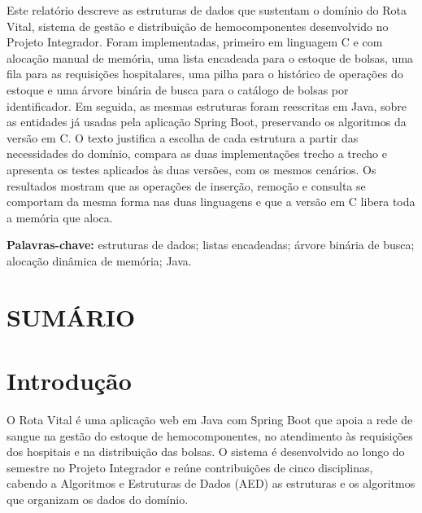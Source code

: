 \documentclass[12pt,a4paper,oneside]{report}
\renewcommand{\headrulewidth}{0pt}
\begin{document}
\begin{singlespace}
Este relatório descreve as estruturas de dados que sustentam o domínio do Rota Vital, sistema de gestão e distribuição de hemocomponentes desenvolvido no Projeto Integrador. Foram implementadas, primeiro em linguagem C e com alocação manual de memória, uma lista encadeada para o estoque de bolsas, uma fila para as requisições hospitalares, uma pilha para o histórico de operações do estoque e uma árvore binária de busca para o catálogo de bolsas por identificador. Em seguida, as mesmas estruturas foram reescritas em Java, sobre as entidades já usadas pela aplicação Spring Boot, preservando os algoritmos da versão em C. O texto justifica a escolha de cada estrutura a partir das necessidades do domínio, compara as duas implementações trecho a trecho e apresenta os testes aplicados às duas versões, com os mesmos cenários. Os resultados mostram que as operações de inserção, remoção e consulta se comportam da mesma forma nas duas linguagens e que a versão em C libera toda a memória que aloca.

\vspace{12pt}
\noindent\textbf{Palavras-chave:} estruturas de dados; listas encadeadas; árvore binária de busca; alocação dinâmica de memória; Java.
\end{singlespace}

\chapter*{SUMÁRIO}
\thispagestyle{empty}
\makeatletter{}\makeatother

\cleardoublepage
\pagestyle{fancy}
\fancypagestyle{plain}{\fancyhf{}\fancyhead[R]{\small\thepage}\renewcommand{\headrulewidth}{0pt}}
\chapter{Introdução}

O Rota Vital é uma aplicação web em Java com Spring Boot que apoia a rede de sangue na gestão do estoque de hemocomponentes, no atendimento às requisições dos hospitais e na distribuição das bolsas. O sistema é desenvolvido ao longo do semestre no Projeto Integrador e reúne contribuições de cinco disciplinas, cabendo a Algoritmos e Estruturas de Dados (AED) as estruturas e os algoritmos que organizam os dados do domínio.
\end{document}
